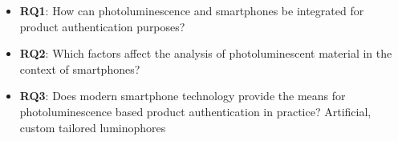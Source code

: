 \documentclass[thesis.tex]{subfiles}
\begin{document}
\begin{itemize}
  \item \textbf{RQ1}: How can photoluminescence and smartphones be integrated for product authentication purposes?
  \item \textbf{RQ2}: Which factors affect the analysis of photoluminescent material in the context of smartphones?
  \item \textbf{RQ3}: Does modern smartphone technology provide the means for photoluminescence based product authentication in practice?
    Artificial, custom tailored luminophores
\end{itemize}
\end{document}
